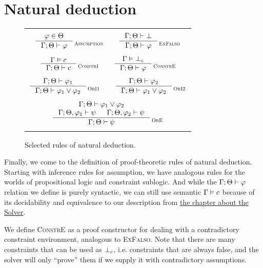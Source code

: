 \documentclass[english, mgr]{iithesis}
\renewcommand{\sc}[1]{\textsc{\small{#1}}}
\newcommand{\scbrk}[2]{\myatop{\textsc{#1}}{\textsc{#2}}}
\begin{document}
\section{Natural deduction}
\begin{figure}[htbp]
  \centering
  \begin{tabularx}{\textwidth}{|C|}
  \hline \\ $
  \inference{
    \formphi \in \Theta
  }{
    \jgmnt[\cEnv;\Theta]{\formphi}
  }\scbrk{}{Assumption}
  \qquad
  \inference{
    \jgmnt[\cEnv;\Theta]{\bot}
  }{
    \jgmnt[\cEnv;\Theta]{\formphi}
  }\scbrk{}{ExFalso}
  $ \\ \\ $
  \inference{
    \cjgmnt[\cEnv]{\constr}
  }{
    \jgmnt[\cEnv;\Theta]{\constr}
  }\scbrk{}{ConstrI}
  \qquad
  \inference{
    \cjgmnt[\cEnv]{\bot_\constr}
    }{
    \jgmnt[\cEnv;\Theta]{\formphi}
  }\scbrk{}{ConstrE}
  $ \\ \\ $
  \inference{
    \jgmnt[\cEnv;\Theta]{\formphi_1}
    }{
    \jgmnt[\cEnv;\Theta]{\formphi_1 \vee \formphi_2}
  }\scbrk{}{OrI1}
  \qquad
  \inference{
    \jgmnt[\cEnv;\Theta]{\formphi_2}
  }{
    \jgmnt[\cEnv;\Theta]{\formphi_1 \vee \formphi_2}
  }\scbrk{}{OrI2}
  $ \\ \\ $
  \inference{
    \jgmnt[\cEnv;\Theta]{\formphi_1 \vee \formphi_2} \\
    \jgmnt[\cEnv;\Theta,\formphi_1]{\psi} &
    \jgmnt[\cEnv;\Theta,\formphi_2]{\psi}
  }{
    \jgmnt[\cEnv;\Theta]{\psi}
  }\scbrk{}{OrE}
  $ \\ \\ \hline
  \end{tabularx}
  \caption{Selected rules of natural deduction.}
  \label{fig:deduction}
\end{figure}
Finally, we come to the definition of proof-theoretic rules of natural deduction.
Starting with inference rules for assumption,
we have analogous rules for the worlds of propositional logic
and constraint sublogic.
And while the $\jgmnt[\cEnv;\Theta]{\formphi}$ relation we define is purely syntactic,
we can still use semantic $\cjgmnt[\cEnv]{\constr}$ because of its decidability and equivalence
to our description from \hyperref[sec:solver]{the chapter about the Solver}.

We define \sc{ConstrE} as a proof constructor for dealing with a contradictory
constraint environment, analogous to \sc{ExFalso}.
Note that there are many constraints that can be used as $\bot_c$, i.e.
constraints that are always false, and the solver will only ``prove'' them
if we supply it with contradictory assumptions.
\end{document}
